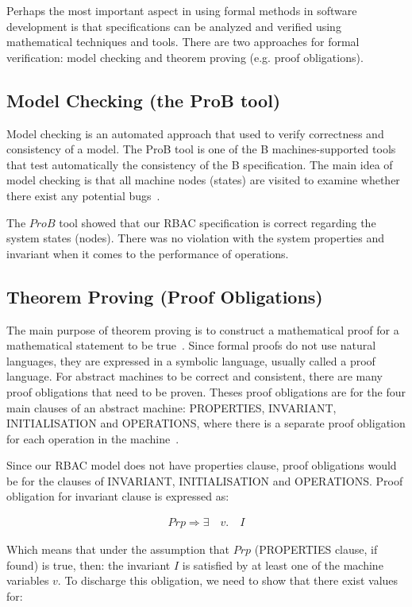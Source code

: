 Perhaps the most important aspect in using formal methods in software development is that specifications can be analyzed and verified using mathematical techniques and tools.  There are two approaches for formal verification: model checking and theorem proving (e.g. proof obligations).

\subsection{Model Checking (the ProB tool)}
 
Model checking is an automated approach that used to verify correctness and consistency of a model.  The ProB tool is one of the B machines-supported tools that test automatically the consistency of the B specification.  The main idea of model checking is that all machine nodes (states) are visited to examine whether there exist any potential bugs~\cite{MMFA2012}.

The $ProB$ tool showed that our RBAC specification is correct regarding the system states (nodes).  There was no violation with the system properties and invariant when it comes to the performance of operations.

\subsection{Theorem Proving (Proof Obligations)}
The main purpose of theorem proving is to construct a mathematical proof for a mathematical statement to be true~\cite{Bou2012}.  Since formal proofs do not use natural languages, they are expressed in a symbolic language, usually called a proof language. 
For abstract machines to be correct and consistent, there are many proof obligations that need to be proven.  Theses proof obligations are for the four main clauses of an abstract machine: PROPERTIES, INVARIANT, INITIALISATION and OPERATIONS, where there is a separate proof obligation for each operation in the machine~\cite{MMFA2012}. 


Since our RBAC model does not have properties clause, proof obligations would be for the clauses of INVARIANT, INITIALISATION and OPERATIONS.  Proof obligation for invariant clause is expressed as:

\begin{align*}
Prp \Rightarrow  \exists \quad v. \quad I
\end{align*}

      Which means that under the assumption that $Prp$ (PROPERTIES clause, if found) is true, then: the invariant $I$ is satisfied by at least one of the machine variables $v$.
     To discharge this obligation, we need to show that there exist values for:
     
